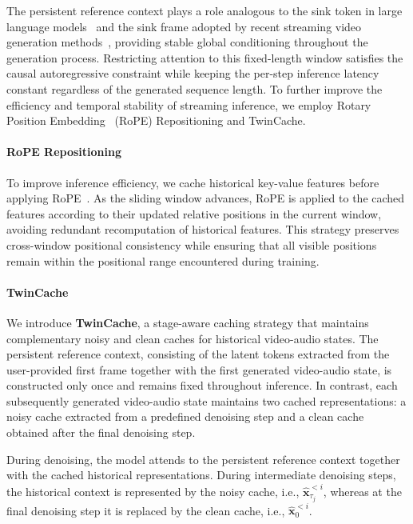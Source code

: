 The persistent reference context plays a role analogous to the sink token in large language models~\cite{xiao2024efficient} and the sink frame adopted by recent streaming video generation methods~\cite{yesiltepe2026infinity,yang2025longlive}, providing stable global conditioning throughout the generation process. Restricting attention to this fixed-length window satisfies the causal autoregressive constraint while keeping the per-step inference latency constant regardless of the generated sequence length. To further improve the efficiency and temporal stability of streaming inference, we employ Rotary Position Embedding~\citep{su2024roformer} (RoPE) Repositioning and TwinCache.

\paragraph{RoPE Repositioning}
To improve inference efficiency, we cache historical key-value features before applying RoPE~\cite{yesiltepe2026infinity,yi2025deep,li2026rolling,chen2026grounded,kim2026memrope}. As the sliding window advances, RoPE is applied to the cached features according to their updated relative positions in the current window, avoiding redundant recomputation of historical features. This strategy preserves cross-window positional consistency while ensuring that all visible positions remain within the positional range encountered during training.

\paragraph{TwinCache}
We introduce \textbf{TwinCache}, a stage-aware caching strategy that maintains complementary noisy and clean caches for historical video-audio states. The persistent reference context, consisting of the latent tokens extracted from the user-provided first frame together with the first generated video-audio state, is constructed only once and remains fixed throughout inference. In contrast, each subsequently generated video-audio state maintains two cached representations: a noisy cache extracted from a predefined denoising step and a clean cache obtained after the final denoising step.

During denoising, the model attends to the persistent reference context together with the cached historical representations. During intermediate denoising steps, the historical context is represented by the noisy cache, i.e., $\hat{\bm{x}}_{\tau_j}^{<i}$, whereas at the final denoising step it is replaced by the clean cache, i.e., $\hat{\bm{x}}_{0}^{<i}$.

